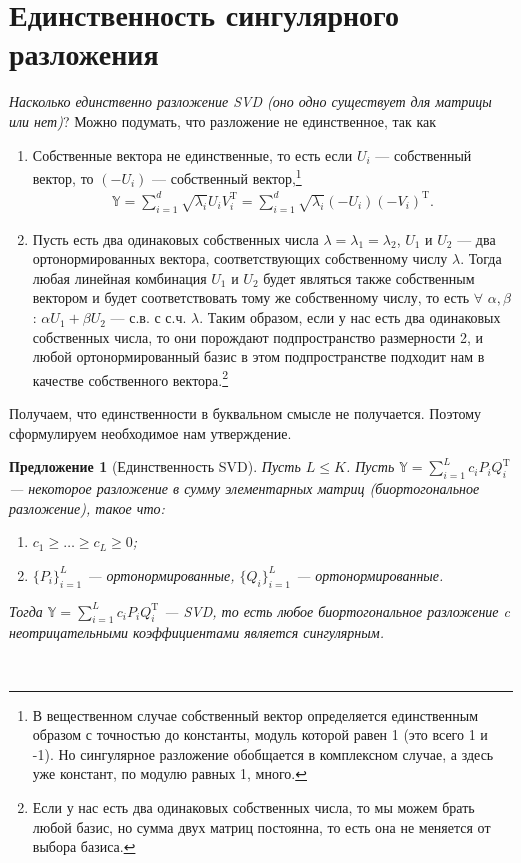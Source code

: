 \documentclass[specialist, 12pt,
subf, %
href, colorlinks=true,
substylefile = spbu.rtx,
]{disser}
\newtheorem{proposition}{Предложение}
\begin{document}
\section{Единственность сингулярного разложения}
\textit{Насколько единственно разложение SVD (оно одно существует для матрицы или нет)}?
Можно подумать, что разложение не единственное, так как
\begin{enumerate}
	\item Собственные вектора не единственные, то есть если $U_i$ --- собственный вектор, то $(-U_i)$ --- собственный вектор,\footnote{В вещественном случае собственный вектор определяется единственным образом с точностью до константы, модуль которой равен 1 (это всего 1 и -1). Но сингулярное разложение обобщается в комплексном случае, а здесь уже констант, по модулю равных 1, много.}
	\begin{gather*}
	\mathbb{Y} = \sum\limits_{i = 1}^d \sqrt{\lambda_i}U_i V_i^{\mathrm{T}} = \sum\limits_{i = 1}^d \sqrt{\lambda_i}(-U_i) (-V_i)^{\mathrm{T}}.
	\end{gather*}
	\item Пусть есть два одинаковых собственных числа $\lambda = \lambda_1 = \lambda_2$, $U_1$ и $U_2$ --- два ортонормированных вектора, соответствующих собственному числу $\lambda$. Тогда любая линейная комбинация $U_1$ и $U_2$ будет являться также собственным вектором и будет соответствовать тому же собственному числу, то есть $\forall$ $\alpha, \beta$: $\alpha U_1 + \beta U_2$ --- с.в. с с.ч. $\lambda$. Таким образом, если у нас есть два одинаковых собственных числа, то они порождают подпространство размерности 2, и любой ортонормированный базис в этом подпространстве подходит нам в качестве собственного вектора.\footnote{Если у нас есть два одинаковых собственных числа, то мы можем брать любой базис, но сумма двух матриц постоянна, то есть она не меняется от выбора базиса.  }
\end{enumerate}

Получаем, что единственности в буквальном смысле не получается. Поэтому сформулируем необходимое нам утверждение.
\begin{proposition}[Единственность SVD]
	Пусть $L\le K$. Пусть $\mathbb{Y} = \sum\limits_{i = 1}^L c_i P_i Q_i^{\mathrm{T}}$ --- некоторое разложение в сумму элементарных матриц (биортогональное разложение), такое что:
	\begin{enumerate}
		\item $c_1 \geq \ldots \geq c_L \geq 0$;
		\item $\{P_i\}_{i=1}^L$ --- ортонормированные, $\{Q_i\}_{i=1}^L$ --- ортонормированные.
	\end{enumerate}
Тогда $\mathbb{Y} = \sum\limits_{i = 1}^L c_i P_i Q_i^{\mathrm{T}}$ --- SVD, то есть \textit{любое биортогональное разложение c неотрицательными коэффициентами является сингулярным.}
\end{proposition}
~\\
\end{document}
